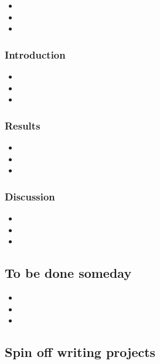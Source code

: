 \documentclass[10pt,letterpaper]{article}
\newcommand{\bi}{\begin{itemize}}
\newcommand{\ei}{\end{itemize}}
\begin{document}
\bi
    \item  
    \item  
    \item  
\ei


\subsubsection{Introduction}
\label{ssubsec:new-ideas:Intro}


\bi
    \item  
    \item  
    \item  
\ei

\subsubsection{Results}
\label{ssubsec:new-ideas:Results}

\bi
    \item  
    \item  
    \item  
\ei

\subsubsection{Discussion}
\label{ssubsec:new-ideas:Discussion}

\bi
    \item  
    \item  
    \item  
\ei

\subsection{To be done someday}
\label{subsec:someday}

\bi
    \item  
    \item  
    \item  
\ei

\subsection{Spin off writing projects}
\label{subsec:spinoffs}

\begin{description}
    \item [ ]
    \item [ ]
    \item [ ]
    \item [ ]
\end{description}
\end{document}
